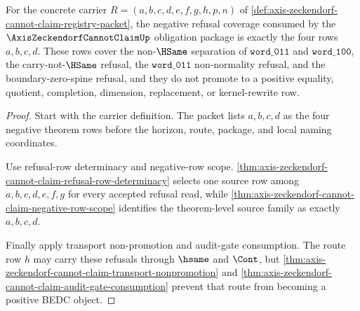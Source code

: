 \begin{theorem}
\label{thm:axis-zeckendorf-cannot-claim-negative-refusal-coverage}
For the concrete carrier $R=(a,b,c,d,e,f,g,h,p,n)$ of \autoref{def:axis-zeckendorf-cannot-claim-registry-packet}, the negative refusal coverage consumed by the $\AxisZeckendorfCannotClaimUp$ obligation package is exactly the four rows $a,b,c,d$. These rows cover the non-$\HSame$ separation of $\mathtt{word\_011}$ and $\mathtt{word\_100}$, the carry-not-$\HSame$ refusal, the $\mathtt{word\_011}$ non-normality refusal, and the boundary-zero-spine refusal, and they do not promote to a positive equality, quotient, completion, dimension, replacement, or kernel-rewrite row.
\end{theorem}
\begin{proof}
Start with the carrier definition. The packet lists $a,b,c,d$ as the four negative theorem rows before the horizon, route, package, and local naming coordinates.

Use refusal-row determinacy and negative-row scope. \autoref{thm:axis-zeckendorf-cannot-claim-refusal-row-determinacy} selects one source row among $a,b,c,d,e,f,g$ for every accepted refusal read, while \autoref{thm:axis-zeckendorf-cannot-claim-negative-row-scope} identifies the theorem-level source family as exactly $a,b,c,d$.

Finally apply transport non-promotion and audit-gate consumption. The route row $h$ may carry these refusals through $\hsame$ and $\Cont$, but \autoref{thm:axis-zeckendorf-cannot-claim-transport-nonpromotion} and \autoref{thm:axis-zeckendorf-cannot-claim-audit-gate-consumption} prevent that route from becoming a positive BEDC object.
\end{proof}


